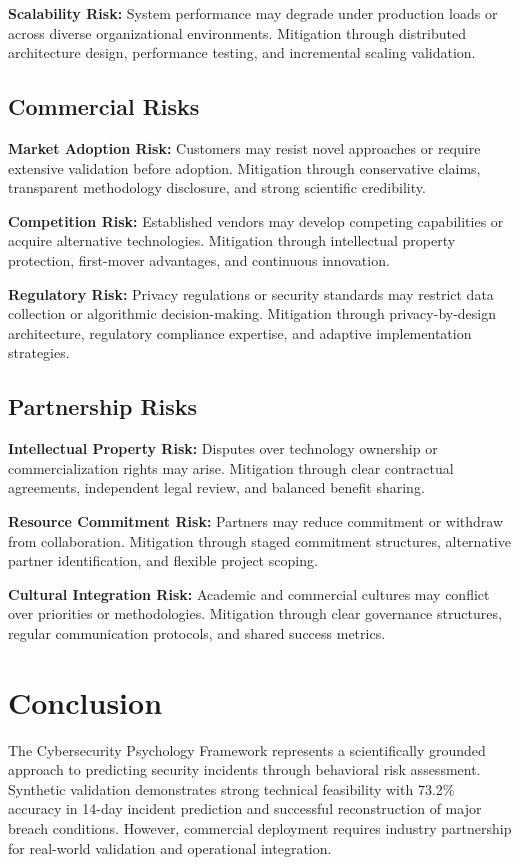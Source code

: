 \documentclass[10pt,twocolumn]{IEEEtran}
\begin{document}
\textbf{Scalability Risk:} System performance may degrade under production loads or across diverse organizational environments. Mitigation through distributed architecture design, performance testing, and incremental scaling validation.

\subsection{Commercial Risks}

\textbf{Market Adoption Risk:} Customers may resist novel approaches or require extensive validation before adoption. Mitigation through conservative claims, transparent methodology disclosure, and strong scientific credibility.

\textbf{Competition Risk:} Established vendors may develop competing capabilities or acquire alternative technologies. Mitigation through intellectual property protection, first-mover advantages, and continuous innovation.

\textbf{Regulatory Risk:} Privacy regulations or security standards may restrict data collection or algorithmic decision-making. Mitigation through privacy-by-design architecture, regulatory compliance expertise, and adaptive implementation strategies.

\subsection{Partnership Risks}

\textbf{Intellectual Property Risk:} Disputes over technology ownership or commercialization rights may arise. Mitigation through clear contractual agreements, independent legal review, and balanced benefit sharing.

\textbf{Resource Commitment Risk:} Partners may reduce commitment or withdraw from collaboration. Mitigation through staged commitment structures, alternative partner identification, and flexible project scoping.

\textbf{Cultural Integration Risk:} Academic and commercial cultures may conflict over priorities or methodologies. Mitigation through clear governance structures, regular communication protocols, and shared success metrics.

\section{Conclusion}

The Cybersecurity Psychology Framework represents a scientifically grounded approach to predicting security incidents through behavioral risk assessment. Synthetic validation demonstrates strong technical feasibility with 73.2\% accuracy in 14-day incident prediction and successful reconstruction of major breach conditions. However, commercial deployment requires industry partnership for real-world validation and operational integration.
\end{document}
